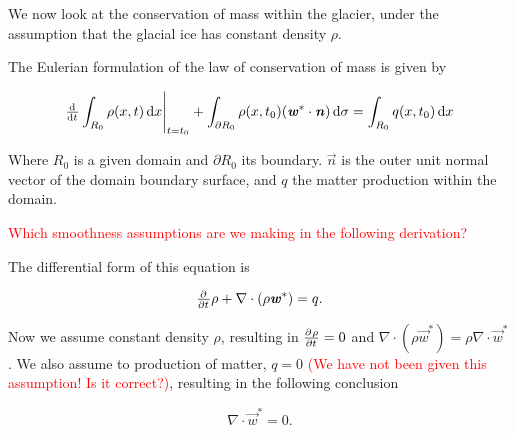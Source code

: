 We now look at the conservation of mass within the glacier, under the assumption that the glacial ice has constant density $\rho$.

The Eulerian formulation of the law of conservation of mass is given by

\begin{equation}
  \eval{\od{}{t} \int_{R_0} \rho(x, t) \dif{x}}_{t = t_0} + \int_{\partial R_0} \rho(x, t_0) (\vec{w}^* \cdot \vec{n}) \dif{\sigma} = \int_{R_0} q(x, t_0) \dif{x}
\end{equation}

Where $R_0$ is a given domain and $\partial R_0$ its boundary. $\vec{n}$ is the outer unit normal vector of the domain boundary surface, and $q$ the matter production within the domain.

\textcolor{red}{Which smoothness assumptions are we making in the following derivation?}

The differential form of this equation is

\begin{equation}
  \pd{}{t} \rho + \nabla \cdot (\rho \vec{w}^*) = q.
  \label{eq:conservation_of_matter}
\end{equation}

Now we assume constant density $\rho$, resulting in $\pd{\rho}{t} = 0$ and $\nabla \cdot (\rho \vec{w}^*) = \rho \nabla \cdot \vec{w}^*$. We also assume to production of matter, $q = 0$ \textcolor{red}{(We have not been given this assumption! Is it correct?)}, resulting in the following conclusion

\begin{equation} \label{eq:velocity-divergence}
  \nabla \cdot \vec{w}^* = 0.
\end{equation}
